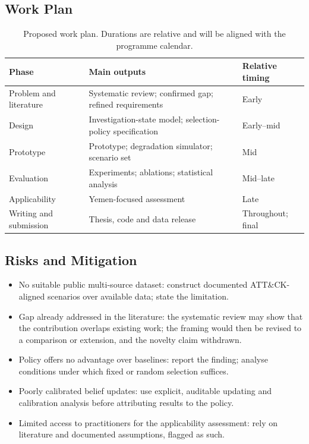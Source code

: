 \documentclass[a4paper,11pt,oneside]{article}
\begin{document}
\subsection{Work Plan}
\begin{table}[htbp]
\centering
\caption{Proposed work plan. Durations are relative and will be aligned with the programme calendar.}
\label{tab:workplan}
\small
\begin{tabularx}{\textwidth}{@{}p{}X p{}@{}}
\toprule
\textbf{Phase} & \textbf{Main outputs} & \textbf{Relative timing} \\
\midrule
Problem and literature & Systematic review; confirmed gap; refined requirements & Early \\
Design & Investigation-state model; selection-policy specification & Early--mid \\
Prototype & Prototype; degradation simulator; scenario set & Mid \\
Evaluation & Experiments; ablations; statistical analysis & Mid--late \\
Applicability & Yemen-focused assessment & Late \\
Writing and submission & Thesis, code and data release & Throughout; final \\
\bottomrule
\end{tabularx}
\end{table}
\subsection{Risks and Mitigation}
\begin{itemize}[leftmargin=*, itemsep=2pt, topsep=3pt]
\item No suitable public multi-source dataset: construct documented ATT\&CK-aligned scenarios over available data; state the limitation.
\item Gap already addressed in the literature: the systematic review may show that
the contribution overlaps existing work; the framing would then be revised to a comparison or extension, and the novelty claim withdrawn.
\item Policy offers no advantage over baselines: report the finding; analyse conditions
under which fixed or random selection suffices.
\item Poorly calibrated belief updates: use explicit, auditable updating and calibration
analysis before attributing results to the policy.
\item Limited access to practitioners for the applicability assessment: rely on
literature and documented assumptions, flagged as such.
\end{itemize}
\end{document}
